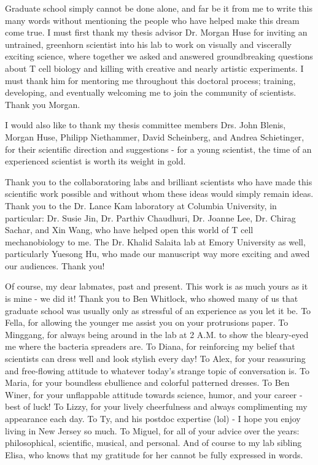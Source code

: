 \documentclass[phd,tocprelim]{cornell}
\begin{document}
\begin{acknowledgements}
Graduate school simply cannot be done alone, and far be it from me to write this many words without mentioning the people who have helped make this dream come true. I must first thank my thesis advisor Dr. Morgan Huse for inviting an untrained, greenhorn scientist into his lab to work on visually and viscerally exciting science, where together we asked and answered groundbreaking questions about T cell biology and killing with creative and nearly artistic experiments. I must thank him for mentoring me throughout this doctoral process; training, developing, and eventually welcoming me to join the community of scientists. Thank you Morgan.

I would also like to thank my thesis committee members Drs. John Blenis,  Morgan Huse, Philipp Niethammer, David Scheinberg, and Andrea Schietinger, for their scientific direction and suggestions - for a young scientist, the time of an experienced scientist is worth its weight in gold. 

Thank you to the collaboratoring labs and brilliant scientists who have made this scientific work possible and without whom these ideas would simply remain ideas. Thank you to the Dr. Lance Kam laboratory at Columbia University, in particular: Dr. Susie Jin, Dr. Parthiv Chaudhuri,  Dr. Joanne Lee, Dr. Chirag Sachar, and Xin Wang, who have helped open this world of T cell mechanobiology to me. The Dr. Khalid Salaita lab at Emory University as well, particularly Yuesong Hu, who made our manuscript way more exciting and awed our audiences. Thank you!

Of course, my dear labmates, past and present. This work is as much yours as it is mine - we did it! Thank you to Ben Whitlock, who showed many of us that graduate school was usually only as stressful of an experience as you let it be. To Fella, for allowing the younger me assist you on your protrusions paper. To Minggang, for always being around in the lab at 2 A.M. to show the bleary-eyed me where the bacteria spreaders are. To Diana, for reinforcing my belief that scientists can dress well and look stylish every day! To Alex, for your reassuring and free-flowing attitude to whatever today's strange topic of conversation is. To Maria, for your boundless ebullience and colorful patterned dresses. To Ben Winer, for your unflappable attitude towards science, humor, and your career - best of luck! To Lizzy, for your lively cheerfulness and always complimenting my appearance each day. To Ty, and his postdoc expertise (lol) - I hope you enjoy living in New Jersey so much. To Miguel, for all of your advice over the years: philosophical, scientific, musical, and personal. And of course to my lab sibling Elisa, who knows that my gratitude for her cannot be fully expressed in words. 


\end{acknowledgements}
\end{document}

